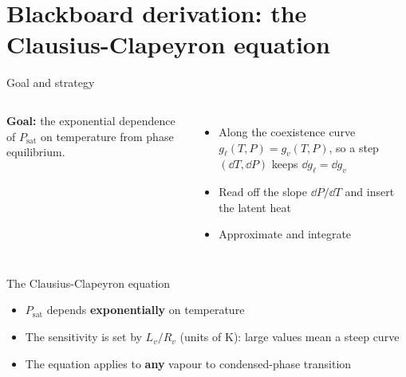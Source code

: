 \documentclass[aspectratio=169, 11pt]{beamer}
\begin{document}
\begin{frame}
\end{frame}


\section{Blackboard derivation: the Clausius-Clapeyron equation}

\begin{frame}{Goal and strategy}
  \begin{columns}[c]
    \column{\recapfigcolnarrow}
    \column{\recaptextcolwide}
    \textbf{Goal:} the exponential dependence of $P_{\mathrm{sat}}$ on temperature from phase equilibrium.
    \vskip8pt
    \begin{itemize}\setlength\itemsep{2pt}
      \item Along the coexistence curve $g_\ell(T, P) = g_v(T, P)$, so a step $(\dd T, \dd P)$ keeps $\dd g_\ell = \dd g_v$
      \item Read off the slope $\dd P/\dd T$ and insert the latent heat
      \item Approximate and integrate
    \end{itemize}
    \vskip8pt
  \end{columns}
\end{frame}

\begin{frame}{The Clausius-Clapeyron equation}
  \vskip8pt
  \begin{itemize}\setlength\itemsep{3pt}
    \item $P_{\mathrm{sat}}$ depends \textbf{exponentially} on temperature
    \item The sensitivity is set by $L_v/R_v$ (units of K): large values mean a steep curve
    \item The equation applies to \textbf{any} vapour to condensed-phase transition
  \end{itemize}
\end{frame}
\end{document}

